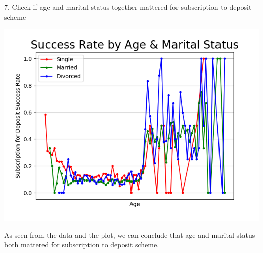 \documentclass{article}
\begin{document}
7. Check if age and marital status together mattered for subscription to deposit scheme

\includegraphics[scale=0.85]{images/age_marital.png}

As seen from the data and the plot, we can conclude that age and marital status both mattered for subscription to deposit scheme.
\end{document}
